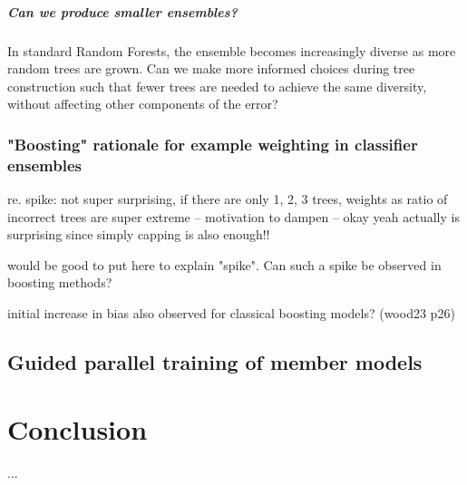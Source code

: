 \documentclass[
	twoside=false, %
]{kaobook}
\begin{document}
\paragraph{Can we produce smaller ensembles?} In standard Random Forests, the ensemble becomes increasingly diverse as more random trees are grown. Can we make more informed choices during tree construction such that fewer trees are needed to achieve the same diversity, without affecting other components of the error?



\subsection{"Boosting" rationale for example weighting in classifier ensembles}

re. spike: not super surprising, if there are only 1, 2, 3 trees, weights as ratio of incorrect trees are super extreme -- motivation to dampen
-- okay yeah actually is surprising since simply capping is also enough!!

would be good to put here to explain "spike". Can such a spike be observed in boosting methods?

initial increase in bias also observed for classical boosting models? (wood23 p26)






\pagebreak
\section{Guided parallel training of member models}
\label{sec:guided-parallel-training}






\chapter{Conclusion}
...
\end{document}
